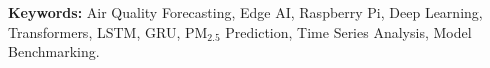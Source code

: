 \documentclass[12pt,a4paper]{report}
\begin{document}
\noindent \textbf{Keywords:} Air Quality Forecasting, Edge AI, Raspberry Pi, Deep Learning, Transformers, LSTM, GRU, PM$_{2.5}$ Prediction, Time Series Analysis, Model Benchmarking.

\newpage\thispagestyle{plain}\tableofcontents
\newpage\thispagestyle{plain}\listoffigures
\newpage\thispagestyle{plain}\listoftables








\end{document}
